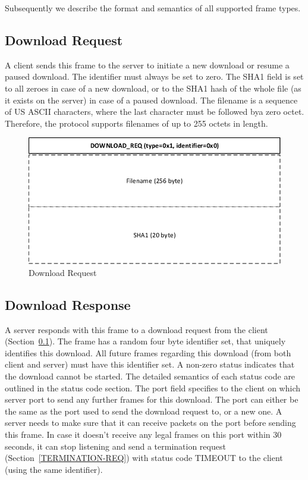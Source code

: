 \documentclass[]{article}
\begin{document}
Subsequently we describe the format and semantics of all supported frame types. 

\subsection{Download Request}
\label{DOWNLOAD-REQ}

A client sends this frame to the server to initiate a new download
or resume a paused download. The identifier must always be set to zero.  
The SHA1 field is set to all zeroes in case of a new download, or to
the SHA1 hash of the whole file (as it exists on the server) 
in case of a paused download. The filename is a sequence of US ASCII
characters, where the last character must be followed bya zero octet.
Therefore, the protocol supports filenames of up to 255 octets in length.

\begin{figure}[H]
\centering
\includegraphics[width=\textwidth]{frames/download-req.pdf}
\caption{Download Request}

\end{figure}

\subsection{Download Response}

A server responds with this frame to a download request from the
client (Section~\ref{DOWNLOAD-REQ}). The frame has a random four 
byte identifier set, that uniquely identifies this download. All
future frames regarding this download (from both client and server)
must have this identifier set. A non-zero status indicates that the
download cannot be started. The detailed semantics of each status code are outlined
in the status code section. The port field specifies to the client
on which server port to send any further frames for this download.
The port can either be the same as the port used to send the
download request to, or a new one. A server needs to make sure
that it can receive packets on the port before sending this frame. 
In case it doesn't receive any legal frames on this port within 30
seconds, it can stop listening and send a termination request (Section~\ref{TERMINATION-REQ})
with status code TIMEOUT to the client (using the same identifier).
\end{document}
